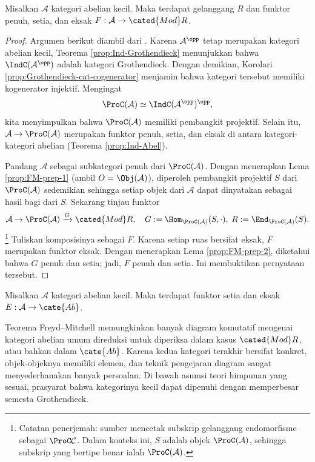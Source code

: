 \begin{theorem}\label{prop:FM}
	Misalkan $\mathcal{A}$ kategori abelian kecil. Maka terdapat gelanggang $R$ dan funktor penuh, setia, dan eksak $F: \mathcal{A} \to \cated{Mod}R$.
\end{theorem}
\begin{proof}
	Argumen berikut diambil dari \cite[Teorema 9.6.10]{KS06}. Karena $\mathcal{A}^{\opp}$ tetap merupakan kategori abelian kecil, Teorema \ref{prop:Ind-Grothendieck} menunjukkan bahwa $\IndC(\mathcal{A}^{\opp})$ adalah kategori Grothendieck. Dengan demikian, Korolari \ref{prop:Grothendieck-cat-cogenerator} menjamin bahwa kategori tersebut memiliki kogenerator injektif. Mengingat
	\[ \ProC(\mathcal{A}) \simeq \IndC(\mathcal{A}^{\opp})^{\opp}, \]
	kita menyimpulkan bahwa $\ProC(\mathcal{A})$ memiliki pembangkit projektif. Selain itu, $\mathcal{A} \to \ProC(\mathcal{A})$ merupakan funktor penuh, setia, dan eksak di antara kategori-kategori abelian (Teorema \ref{prop:Ind-Abel}).
	
	Pandang $\mathcal{A}$ sebagai subkategori penuh dari $\ProC(\mathcal{A})$. Dengan menerapkan Lema \ref{prop:FM-prep-1} (ambil $O = \Obj(\mathcal{A})$), diperoleh pembangkit projektif $S$ dari $\ProC(\mathcal{A})$ sedemikian sehingga setiap objek dari $\mathcal{A}$ dapat dinyatakan sebagai hasil bagi dari $S$. Sekarang tinjau funktor
	\[ \mathcal{A} \to \ProC(\mathcal{A}) \xrightarrow{G} \cated{Mod}R , \quad G := \Hom_{\ProC(\mathcal{A})}(S, \cdot), \; R := \End_{\ProC(\mathcal{A})}(S). \]\footnote{Catatan penerjemah: sumber mencetak subskrip gelanggang endomorfisme sebagai $\ProC\mathcal{C}$. Dalam konteks ini, $S$ adalah objek $\ProC(\mathcal{A})$, sehingga subskrip yang bertipe benar ialah $\ProC(\mathcal{A})$.}
	Tuliskan komposisinya sebagai $F$. Karena setiap ruas bersifat eksak, $F$ merupakan funktor eksak. Dengan menerapkan Lema \ref{prop:FM-prep-2}, diketahui bahwa $G$ penuh dan setia; jadi, $F$ penuh dan setia. Ini membuktikan pernyataan tersebut.
\end{proof}

\begin{corollary}
	Misalkan $\mathcal{A}$ kategori abelian kecil. Maka terdapat funktor setia dan eksak $E: \mathcal{A} \to \cate{Ab}$.
\end{corollary}

Teorema Freyd--Mitchell memungkinkan banyak diagram komutatif mengenai kategori abelian umum direduksi untuk diperiksa dalam kasus $\cated{Mod}R$, atau bahkan dalam $\cate{Ab}$. Karena kedua kategori terakhir bersifat konkret, objek-objeknya memiliki elemen, dan teknik pengejaran diagram \cite[\S 6.8]{Li1} sangat menyederhanakan banyak persoalan. Di bawah asumsi teori himpunan yang sesuai, prasyarat bahwa kategorinya kecil dapat dipenuhi dengan memperbesar semesta Grothendieck.
